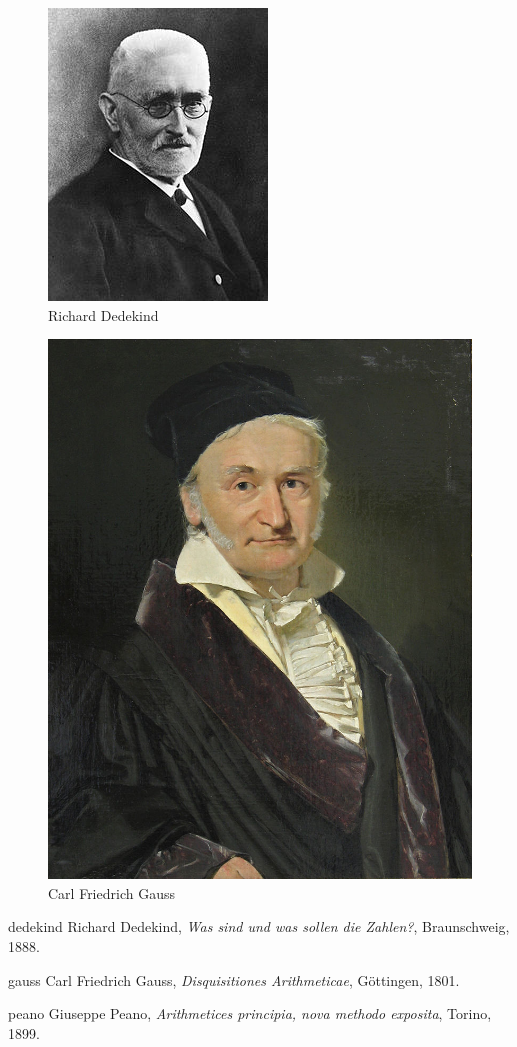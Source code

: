 \documentclass[a4paper,14pt]{report}
\begin{document}
\begin{figure}[h!]
\centering
\includegraphics[width=.7\textwidth]{Richard_Dedekind_1900s.jpg}
\caption{Richard Dedekind}
\end{figure}

\begin{figure}[h!]
\centering
\includegraphics[width=.7\textwidth]{800px-Carl_Friedrich_Gauss_1840_by_Jensen.jpg}
\caption{Carl Friedrich Gauss}
\end{figure}

\begin{thebibliography}{99}

\bibitem%
{dedekind} Richard Dedekind, {\it Was sind und was sollen die Zahlen?}, Braunschweig, 1888.

\bibitem%
{gauss} Carl Friedrich Gauss, {\it Disquisitiones Arithmeticae}, G\"ottingen, 1801.

\bibitem%
{peano} Giuseppe Peano, {\em  Arithmetices principia, nova methodo exposita}, Torino, 1899.

\end{thebibliography}
\end{document}

